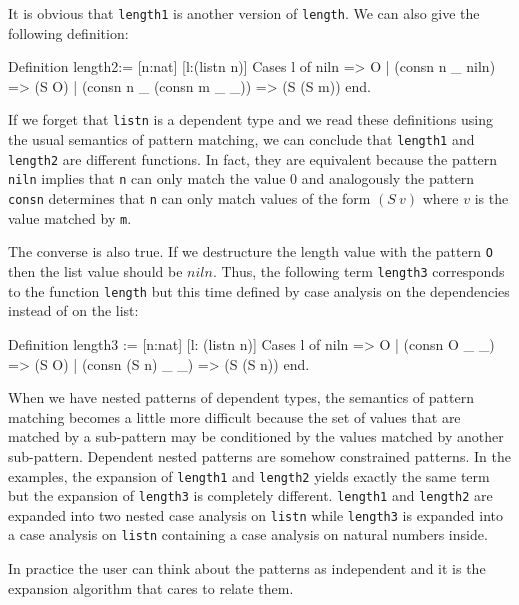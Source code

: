 It is obvious that \verb+length1+ is  another version of
\verb+length+. We can also give the following definition:
\begin{coq_example}
Definition length2:= [n:nat] [l:(listn n)]
 Cases l of 
     niln                    => O
 | (consn n _ niln)          => (S O)
 | (consn n _ (consn m _ _)) => (S (S m))
 end.
\end{coq_example}

If we forget that \verb+listn+ is a dependent type and we read these
definitions using the usual semantics of pattern matching,  we can conclude
that \verb+length1+
and \verb+length2+ are different functions.
In fact, they are equivalent
because the pattern \verb+niln+ implies that \verb+n+ can only match
the value $0$ and analogously the pattern \verb+consn+ determines that \verb+n+ can
only match  values of the form  $(S~v)$ where $v$ is the value matched by
\verb+m+. 


The converse is also true. If
we destructure the  length  value with the pattern \verb+O+ then the list
value should be $niln$. 
Thus, the following term \verb+length3+ corresponds to the function
\verb+length+ but this time defined by case analysis on the dependencies instead of on the list:

\begin{coq_example}
Definition length3 := [n:nat] [l: (listn n)]
                         Cases l of 
                            niln              => O
                         |  (consn O _ _)     => (S O)
                         |  (consn (S n) _ _) => (S (S n))
                         end.
\end{coq_example}

When we have nested patterns of dependent types, the semantics of
pattern matching becomes a little more difficult because
the set of values that are matched by a sub-pattern may be conditioned by the
values matched by another sub-pattern. Dependent nested patterns are
somehow constrained patterns. 
In the examples, the expansion of
\verb+length1+ and \verb+length2+ yields exactly the same term
 but the
expansion of \verb+length3+ is completely different. \verb+length1+ and
\verb+length2+ are expanded into two nested case analysis on
\verb+listn+ while \verb+length3+ is expanded into a case analysis on
\verb+listn+ containing a case analysis on natural numbers inside.


In practice the user can think about the patterns as independent and
it is the expansion algorithm that cares to relate them. \\


